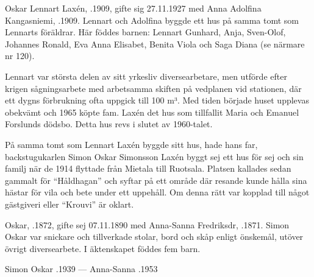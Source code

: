 %
Oskar Lennart Laxén, .1909, gifte sig 27.11.1927 med Anna Adolfina Kangasniemi, .1909. Lennart och Adolfina byggde ett hus på samma tomt som Lennarts föräldrar. Här föddes barnen: Lennart Gunhard, Anja, Sven-Olof, Johannes Ronald, Eva Anna Elisabet, Benita Viola och Saga Diana (se närmare nr 120).

Lennart var största delen av sitt yrkesliv diversearbetare, men utförde efter krigen sågningsarbete med arbetsamma skiften på vedplanen vid stationen, där ett dygns förbrukning ofta uppgick till 100 m³. Med tiden började huset upplevas obekvämt och 1965 köpte fam. Laxén det hus som tillfallit Maria och Emanuel Forslunds dödsbo. Detta hus revs i slutet av 1960-talet.


%
På samma tomt som Lennart Laxén byggde sitt hus, hade hans far, backstugukarlen Simon Oskar Simonsson Laxén byggt sej ett hus för sej och sin familj när de 1914 flyttade från Mietala till Ruotsala. Platsen kallades sedan gammalt för ``Håldhagan'' och syftar på ett område där resande kunde hålla sina hästar för vila och bete under ett uppehåll. Om denna rätt var kopplad till något gästgiveri eller ``Krouvi'' är oklart.

Oskar, .1872, gifte sej 07.11.1890 med Anna-Sanna Fredriksdr, .1871. Simon Oskar var snickare och tillverkade stolar, bord och skåp enligt önskemål, utöver övrigt diversearbete. I äktenskapet föddes fem barn.
\begin{jhchildren}
  \item {}
  \item {}
  \item {}
  \item {}
  \item {}
\end{jhchildren}

Simon Oskar .1939  ---  Anna-Sanna .1953

